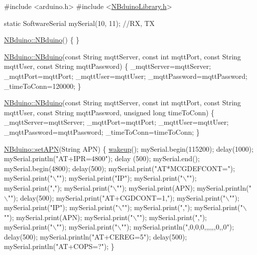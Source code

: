 \begin{DoxyCodeInclude}

\textcolor{preprocessor}{#include <arduino.h>}
\textcolor{preprocessor}{#include <\mbox{\hyperlink{_n_bduino_library_8h}{NBduinoLibrary.h}}>}

\textcolor{keyword}{static} SoftwareSerial mySerial(10, 11); \textcolor{comment}{//RX, TX}

\mbox{\hyperlink{class_n_bduino_acd7c1c69bffccefc807ff89394732a7d}{NBduino::NBduino}}()
\{
\}

\mbox{\hyperlink{class_n_bduino_acd7c1c69bffccefc807ff89394732a7d}{NBduino::NBduino}}(\textcolor{keyword}{const} String mqttServer, \textcolor{keyword}{const} \textcolor{keywordtype}{int} mqttPort, \textcolor{keyword}{const} String mqttUser, \textcolor{keyword}{const} 
      String mqttPassword)
\{
    \_mqttServer=mqttServer;
    \_mqttPort=mqttPort;
    \_mqttUser=mqttUser;
    \_mqttPassword=mqttPassword;
    \_timeToConn=120000;
\}

\mbox{\hyperlink{class_n_bduino_acd7c1c69bffccefc807ff89394732a7d}{NBduino::NBduino}}(\textcolor{keyword}{const} String mqttServer, \textcolor{keyword}{const} \textcolor{keywordtype}{int} mqttPort, \textcolor{keyword}{const} String mqttUser, \textcolor{keyword}{const} 
      String mqttPassword, \textcolor{keywordtype}{unsigned} \textcolor{keywordtype}{long} timeToConn)
\{
    \_mqttServer=mqttServer;
    \_mqttPort=mqttPort;
    \_mqttUser=mqttUser;
    \_mqttPassword=mqttPassword;
    \_timeToConn=timeToConn;
\}

\mbox{\hyperlink{class_n_bduino_a9a903295305e847b3d68a7a6cc111316}{NBduino::setAPN}}(String APN)
\{
  \mbox{\hyperlink{class_n_bduino_a8e740e7b90e6e75b7dd3b7900ee0dd22}{wakeup}}();
  mySerial.begin(115200);
  delay(1000);
  mySerial.println(\textcolor{stringliteral}{"AT+IPR=4800"});
  delay (500);
  mySerial.end();
  mySerial.begin(4800);
  delay(500);
  mySerial.print(\textcolor{stringliteral}{"AT*MCGDEFCONT="});
  mySerial.print(\textcolor{stringliteral}{"\(\backslash\)""});
  mySerial.print(\textcolor{stringliteral}{"IP"});
  mySerial.print(\textcolor{stringliteral}{"\(\backslash\)""});
  mySerial.print(\textcolor{stringliteral}{","});
  mySerial.print(\textcolor{stringliteral}{"\(\backslash\)""});
  mySerial.print(APN);
  mySerial.println(\textcolor{stringliteral}{"\(\backslash\)""});
  delay(500);
  mySerial.print(\textcolor{stringliteral}{"AT+CGDCONT=1,"});
  mySerial.print(\textcolor{stringliteral}{"\(\backslash\)""});
  mySerial.print(\textcolor{stringliteral}{"IP"});
  mySerial.print(\textcolor{stringliteral}{"\(\backslash\)""});
  mySerial.print(\textcolor{stringliteral}{","});
  mySerial.print(\textcolor{stringliteral}{"\(\backslash\)""});
  mySerial.print(APN);
  mySerial.print(\textcolor{stringliteral}{"\(\backslash\)""});
  mySerial.print(\textcolor{stringliteral}{","});
  mySerial.print(\textcolor{stringliteral}{"\(\backslash\)""});
  mySerial.print(\textcolor{stringliteral}{"\(\backslash\)""});
  mySerial.println(\textcolor{stringliteral}{",0,0,0,,,,,,0,,0"});
  delay(500);
  mySerial.println(\textcolor{stringliteral}{"AT+CEREG=5"});
  delay(500);
  mySerial.println(\textcolor{stringliteral}{"AT+COPS=?"});    
\}


\end{DoxyCodeInclude}
